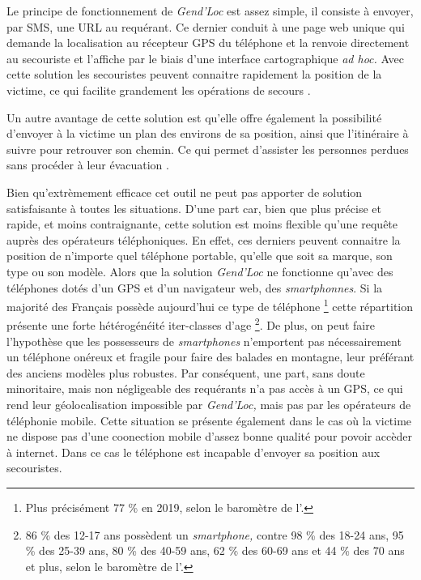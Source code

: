 Le principe de fonctionnement de \emph{Gend'Loc} est assez simple, il
consiste à envoyer, par SMS, une URL au requérant. Ce dernier conduit
à une page web unique qui demande la localisation au récepteur GPS du
téléphone et la renvoie directement au secouriste et l'affiche par le
biais d'une interface cartographique \emph{ad hoc.}  Avec cette
solution les secouristes peuvent connaitre rapidement la position de
la victime, ce qui facilite grandement les opérations de secours
\autocite{Muscat2015}.

Un autre avantage de cette solution est qu'elle offre également la
possibilité d'envoyer à la victime un plan des environs de sa
position, ainsi que l'itinéraire à suivre pour retrouver son
chemin. Ce qui permet d'assister les personnes perdues sans procéder à
leur évacuation \autocite{Muscat2015}.

Bien qu'extrèmement efficace cet outil ne peut pas apporter de
solution satisfaisante à toutes les situations. D'une part car, bien
que plus précise et rapide, et moins contraignante, cette solution est
moins flexible qu'une requête auprès des opérateurs téléphoniques.
En effet, ces derniers peuvent connaitre la position de n'importe quel
téléphone portable, qu'elle que soit sa marque, son type ou son
modèle. Alors que la solution \emph{Gend'Loc} ne fonctionne qu'avec
des téléphones dotés d'un GPS et d'un navigateur web, des
\emph{smartphonnes}. Si la majorité des Français possède aujourd'hui
ce type de téléphone \footnote{Plus précisément 77 \% en 2019, selon
  le baromètre de l'\textcite{ARCEP2019}.} cette répartition présente
une forte hétérogénéité iter-classes d'age \footnote{86 \% des 12-17
  ans possèdent un \emph{smartphone,} contre 98 \% des 18-24 ans, 95
  \% des 25-39 ans, 80 \% des 40-59 ans, 62 \% des 60-69 ans et 44 \%
  des 70 ans et plus, selon le baromètre de
  l'\textcite{ARCEP2019}.}. De plus, on peut faire l'hypothèse que les
possesseurs de \emph{smartphones} n'emportent pas nécessairement un
téléphone onéreux et fragile pour faire des balades en montagne, leur
préférant des anciens modèles plus robustes. Par conséquent, une part,
sans doute minoritaire, mais non négligeable des requérants n'a pas
accès à un GPS, ce qui rend leur géolocalisation impossible par
\emph{Gend'Loc,} mais pas par les opérateurs de téléphonie mobile.
Cette situation se présente également dans le cas où la victime ne
dispose pas d'une coonection mobile d'assez bonne qualité pour povoir
accèder à internet. Dans ce cas le téléphone est incapable d'envoyer
sa position aux secouristes.

